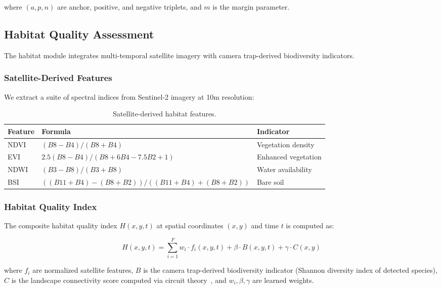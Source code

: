 \documentclass[11pt,letterpaper]{article}
\begin{document}
where $(a, p, n)$ are anchor, positive, and negative triplets, and $m$ is the margin parameter.

\subsection{Habitat Quality Assessment}

The habitat module integrates multi-temporal satellite imagery with camera trap-derived biodiversity indicators.

\subsubsection{Satellite-Derived Features}

We extract a suite of spectral indices from Sentinel-2 imagery at 10m resolution:

\begin{table}[htbp]
\centering
\caption{Satellite-derived habitat features.}
\label{tab:sat_features}
\begin{tabular}{lll}
\toprule
\textbf{Feature} & \textbf{Formula} & \textbf{Indicator} \\
\midrule
NDVI & $(B8 - B4)/(B8 + B4)$ & Vegetation density \\
EVI & $2.5(B8 - B4)/(B8 + 6B4 - 7.5B2 + 1)$ & Enhanced vegetation \\
NDWI & $(B3 - B8)/(B3 + B8)$ & Water availability \\
BSI & $((B11+B4)-(B8+B2))/((B11+B4)+(B8+B2))$ & Bare soil \\
\bottomrule
\end{tabular}
\end{table}

\subsubsection{Habitat Quality Index}

The composite habitat quality index $H(x, y, t)$ at spatial coordinates $(x, y)$ and time $t$ is computed as:

\begin{equation}
H(x, y, t) = \sum_{i=1}^{F} w_i \cdot f_i(x, y, t) + \beta \cdot B(x, y, t) + \gamma \cdot C(x, y)
\end{equation}

where $f_i$ are normalized satellite features, $B$ is the camera trap-derived biodiversity indicator (Shannon diversity index of detected species), $C$ is the landscape connectivity score computed via circuit theory~\cite{mcrae2008}, and $w_i, \beta, \gamma$ are learned weights.
\end{document}
